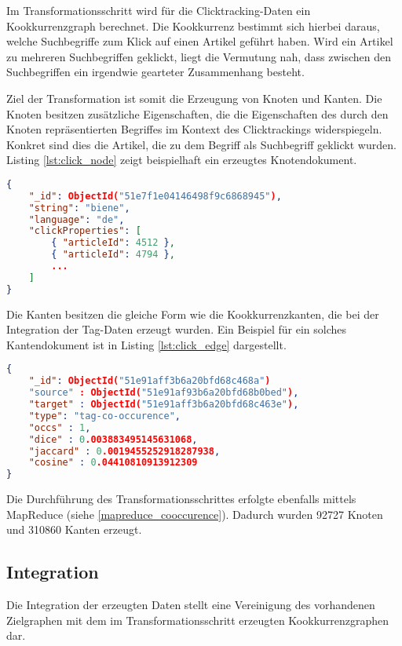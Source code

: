 Im Transformationsschritt wird für die Clicktracking-Daten ein Kookkurrenzgraph berechnet. Die Kookkurrenz bestimmt sich hierbei daraus, welche Suchbegriffe zum Klick auf einen Artikel geführt haben. Wird ein Artikel zu mehreren Suchbegriffen geklickt, liegt die Vermutung nah, dass zwischen den Suchbegriffen ein irgendwie gearteter Zusammenhang besteht.

Ziel der Transformation ist somit die Erzeugung von Knoten und Kanten. Die Knoten besitzen zusätzliche Eigenschaften, die die Eigenschaften des durch den Knoten repräsentierten Begriffes im Kontext des Clicktrackings widerspiegeln. Konkret sind dies die Artikel, die zu dem Begriff als Suchbegriff geklickt wurden. Listing \ref{lst:click_node} zeigt beispielhaft ein erzeugtes Knotendokument.

\begin{lstlisting}[language=json, label={lst:click_node}, caption={Knotendokument mit Clicktracking-Eigenschaften}]
{
    "_id": ObjectId("51e7f1e04146498f9c6868945"),
    "string": "biene",
    "language": "de",
    "clickProperties": [
        { "articleId": 4512 },
        { "articleId": 4794 },
        ...
    ]
}
\end{lstlisting}

Die Kanten besitzen die gleiche Form wie die Kookkurrenzkanten, die bei der Integration der Tag-Daten erzeugt wurden. Ein Beispiel für ein solches Kantendokument ist in Listing \ref{lst:click_edge} dargestellt.

\begin{lstlisting}[language=json, label={lst:click_edge}, caption={Clicktracking-Kookkurrenzkante}]
{
    "_id": ObjectId("51e91aff3b6a20bfd68c468a")
    "source" : ObjectId("51e91af93b6a20bfd68b0bed"),
    "target" : ObjectId("51e91aff3b6a20bfd68c463e"),
    "type": "tag-co-occurence",
    "occs" : 1,
    "dice" : 0.003883495145631068,
    "jaccard" : 0.0019455252918287938,
    "cosine" : 0.04410810913912309
}
\end{lstlisting}

Die Durchführung des Transformationsschrittes erfolgte ebenfalls mittels MapReduce (siehe \ref{mapreduce_cooccurence}). Dadurch wurden \num{92727} Knoten und \num{310860} Kanten erzeugt.

\subsection{Integration}
\label{click_integration}

Die Integration der erzeugten Daten stellt eine Vereinigung des vorhandenen Zielgraphen mit dem im Transformationsschritt erzeugten Kookkurrenzgraphen dar.

